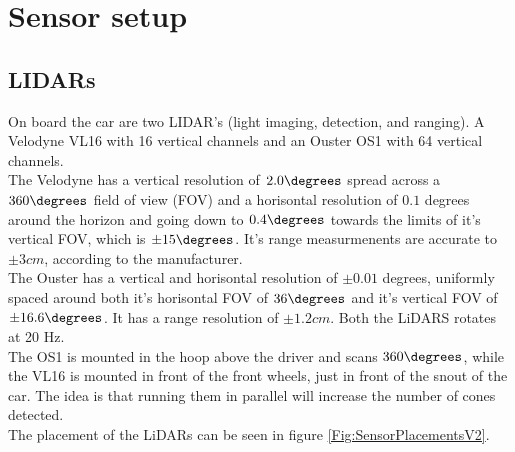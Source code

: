 \section{Sensor setup}
\subsection{LIDARs}
On board the car are two LIDAR's (light imaging, detection, and ranging). A Velodyne VL16 with 16 vertical channels and an Ouster OS1 with 64 vertical channels. \\ 

The Velodyne has a vertical resolution of $2.0\degrees$ spread across a $360\degrees$ field of view (FOV) and a horisontal resolution of $0.1$ degrees around the horizon and going down to $0.4\degrees$ towards the limits of it's vertical FOV, which is $\pm 15\degrees$. It's range measurmenents are accurate to $\pm 3 cm$, according to the manufacturer. \\

The Ouster has a vertical and horisontal resolution of $\pm0.01$ degrees, uniformly spaced around both it's horisontal FOV of $36\degrees$  and it's vertical FOV of $\pm 16.6\degrees$. It has a range resolution of $\pm 1.2 cm$. Both the LiDARS rotates at 20 Hz. \\

The OS1 is mounted in the hoop above the driver and scans $360\degrees$, while the VL16 is mounted in front of the front wheels, just in front of the snout of the car. The idea is that running them in parallel will increase the number of cones detected. \\

The placement of the LiDARs can be seen in figure \ref{Fig:SensorPlacementsV2}.

